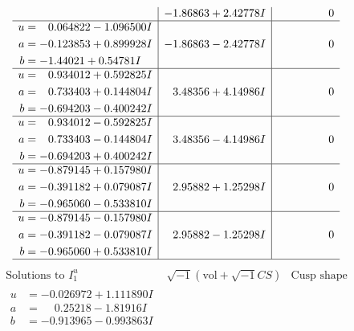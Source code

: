 \documentclass[1p]{elsarticle_modified}
\theoremstyle{definition}
\newcommand{\I}{\sqrt{-1}}
\begin{document}
$$\begin{array}{c|c|c}
 & -1.86863 + 2.42778 I & \phantom{-0.000000 } 0 \\ \hline\begin{aligned}
u &= \phantom{-}0.064822 - 1.096500 I \\
a &= -0.123853 + 0.899928 I \\
b &= -1.44021 + 0.54781 I\end{aligned}
 & -1.86863 - 2.42778 I & \phantom{-0.000000 } 0 \\ \hline\begin{aligned}
u &= \phantom{-}0.934012 + 0.592825 I \\
a &= \phantom{-}0.733403 + 0.144804 I \\
b &= -0.694203 - 0.400242 I\end{aligned}
 & \phantom{-}3.48356 + 4.14986 I & \phantom{-0.000000 } 0 \\ \hline\begin{aligned}
u &= \phantom{-}0.934012 - 0.592825 I \\
a &= \phantom{-}0.733403 - 0.144804 I \\
b &= -0.694203 + 0.400242 I\end{aligned}
 & \phantom{-}3.48356 - 4.14986 I & \phantom{-0.000000 } 0 \\ \hline\begin{aligned}
u &= -0.879145 + 0.157980 I \\
a &= -0.391182 + 0.079087 I \\
b &= -0.965060 - 0.533810 I\end{aligned}
 & \phantom{-}2.95882 + 1.25298 I & \phantom{-0.000000 } 0 \\ \hline\begin{aligned}
u &= -0.879145 - 0.157980 I \\
a &= -0.391182 - 0.079087 I \\
b &= -0.965060 + 0.533810 I\end{aligned}
 & \phantom{-}2.95882 - 1.25298 I & \phantom{-0.000000 } 0\\
 \hline 
 \end{array}$$\newpage$$\begin{array}{c|c|c}  
\text{Solutions to }I^u_{1}& \I (\text{vol} + \sqrt{-1}CS) & \text{Cusp shape}\\
 \hline 
\begin{aligned}
u &= -0.026972 + 1.111890 I \\
a &= \phantom{-}0.25218 - 1.81916 I \\
b &= -0.913965 - 0.993863 I\end{aligned}

\end{array}$$
\end{document}
